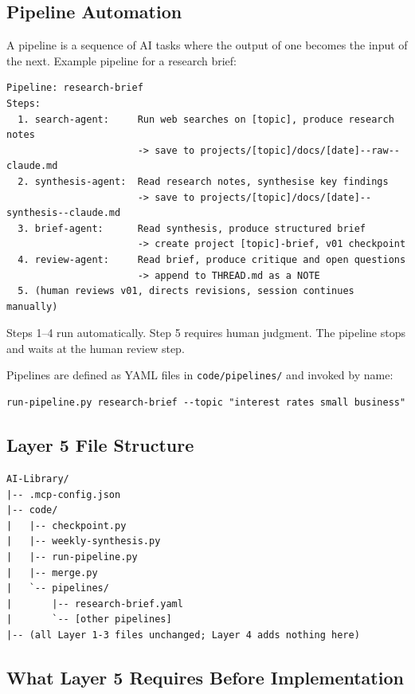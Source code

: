 \documentclass[12pt,letterpaper]{article}
\begin{document}
\subsection{Pipeline Automation}

A pipeline is a sequence of AI tasks where the output of one becomes
the input of the next. Example pipeline for a research brief:

\begin{lstlisting}
Pipeline: research-brief
Steps:
  1. search-agent:     Run web searches on [topic], produce research notes
                       -> save to projects/[topic]/docs/[date]--raw--claude.md
  2. synthesis-agent:  Read research notes, synthesise key findings
                       -> save to projects/[topic]/docs/[date]--synthesis--claude.md
  3. brief-agent:      Read synthesis, produce structured brief
                       -> create project [topic]-brief, v01 checkpoint
  4. review-agent:     Read brief, produce critique and open questions
                       -> append to THREAD.md as a NOTE
  5. (human reviews v01, directs revisions, session continues manually)
\end{lstlisting}

Steps 1--4 run automatically. Step 5 requires human judgment.
The pipeline stops and waits at the human review step.

Pipelines are defined as YAML files in \texttt{code/pipelines/}
and invoked by name:

\begin{lstlisting}
run-pipeline.py research-brief --topic "interest rates small business"
\end{lstlisting}

\subsection{Layer 5 File Structure}

\begin{lstlisting}
AI-Library/
|-- .mcp-config.json
|-- code/
|   |-- checkpoint.py
|   |-- weekly-synthesis.py
|   |-- run-pipeline.py
|   |-- merge.py
|   `-- pipelines/
|       |-- research-brief.yaml
|       `-- [other pipelines]
|-- (all Layer 1-3 files unchanged; Layer 4 adds nothing here)
\end{lstlisting}

\subsection{What Layer 5 Requires Before Implementation}
\end{document}
